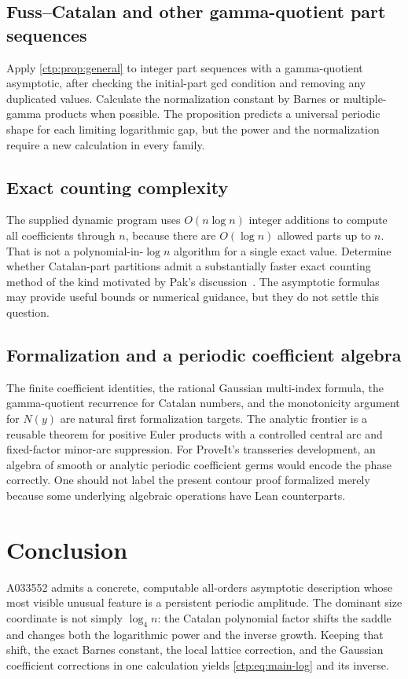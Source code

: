 \documentclass[11pt,a4paper]{article}
\numberwithin{equation}{section}
\theoremstyle{definition}
\theoremstyle{remark}
\begin{document}
\subsection{Fuss--Catalan and other gamma-quotient part sequences}
Apply \cref{ctp:prop:general} to integer part sequences with a gamma-quotient
asymptotic, after checking the initial-part gcd condition and removing
any duplicated values. Calculate the normalization constant by Barnes
or multiple-gamma products when possible. The proposition predicts a
universal periodic shape for each limiting logarithmic gap, but the
power and the normalization require a new calculation in every family.

\subsection{Exact counting complexity}
The supplied dynamic program uses $O(n\log n)$ integer additions to
compute all coefficients through $n$, because there are $O(\log n)$
allowed parts up to $n$. That is not a polynomial-in-$\log n$ algorithm
for a single exact value. Determine whether Catalan-part partitions admit
a substantially faster exact counting method of the kind motivated by
Pak's discussion~\cite{pak}. The asymptotic formulas may provide useful
bounds or numerical guidance, but they do not settle this question.

\subsection{Formalization and a periodic coefficient algebra}
The finite coefficient identities, the rational Gaussian multi-index
formula, the gamma-quotient recurrence for Catalan numbers, and the
monotonicity argument for $N(y)$ are natural first formalization targets.
The analytic frontier is a reusable theorem for positive Euler products
with a controlled central arc and fixed-factor minor-arc suppression.
For ProveIt's transseries development, an algebra of smooth or analytic
periodic coefficient germs would encode the phase correctly. One should
not label the present contour proof formalized merely because some
underlying algebraic operations have Lean counterparts.

\section{Conclusion}
A033552 admits a concrete, computable all-orders asymptotic description
whose most visible unusual feature is a persistent periodic amplitude.
The dominant size coordinate is not simply $\log_4 n$: the Catalan
polynomial factor shifts the saddle and changes both the logarithmic
power and the inverse growth. Keeping that shift, the exact Barnes
constant, the local lattice correction, and the Gaussian coefficient
corrections in one calculation yields \eqref{ctp:eq:main-log} and its inverse.
\end{document}
